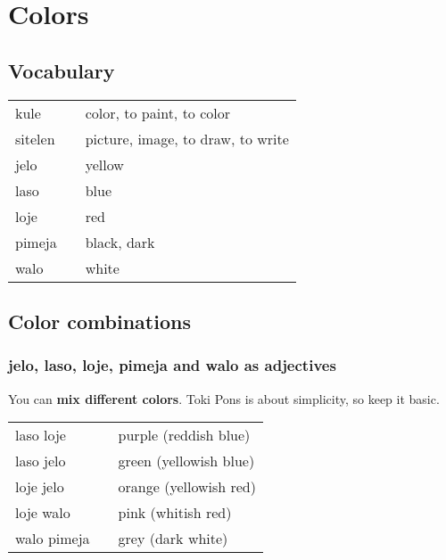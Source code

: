 \section{Colors}
%
\subsection*{Vocabulary}
%
\begin{supertabular}{p{5,5cm}|ll}
kule && color, to paint, to color \\                
sitelen && picture, image, to draw, to write \\
jelo && yellow \\
laso && blue \\
loje && red \\
pimeja && black, dark \\
walo && white \\
\end{supertabular} 
%
\subsection*{Color combinations}
\subsubsection*{jelo, laso, loje, pimeja and walo as adjectives}

%
You can \textbf{mix different colors}. 
Toki Pons is about simplicity, so keep it basic. 

\begin{supertabular}{p{5,5cm}|ll}
laso loje && purple (reddish blue) \\
laso jelo && green (yellowish blue) \\
loje jelo && orange (yellowish red) \\
loje walo && pink (whitish red) \\
walo pimeja && grey (dark white) \\
\end{supertabular} 

